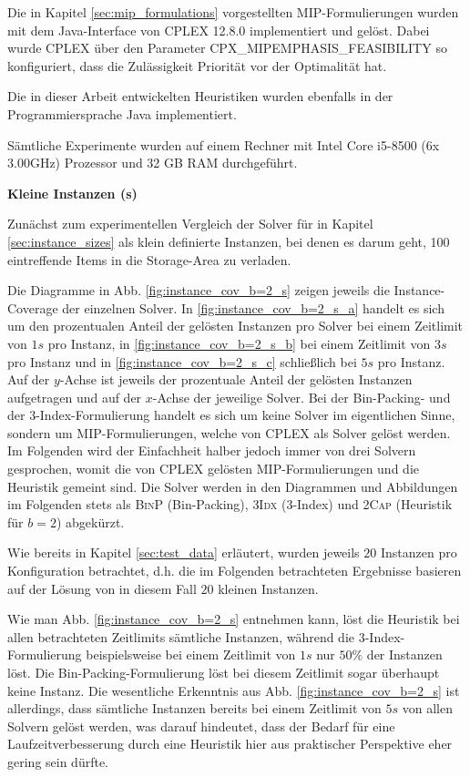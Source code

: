 Die in Kapitel \ref{sec:mip_formulations} vorgestellten MIP-Formulierungen wurden mit dem Java-Interface von CPLEX 12.8.0 implementiert
und gelöst. Dabei wurde CPLEX über den Parameter \textsc{CPX\_MIPEMPHASIS\_FEASIBILITY} so konfiguriert, dass die Zulässigkeit
Priorität vor der Optimalität hat.\cite{IBM_DOC}

Die in dieser Arbeit entwickelten Heuristiken wurden ebenfalls in der Programmiersprache Java implementiert.

Sämtliche Experimente wurden auf einem Rechner mit Intel Core i5-8500 (6x 3.00GHz) Prozessor und 32 GB RAM durchgeführt.

\pagebreak

\textbf{Kleine Instanzen (s)}

Zunächst zum experimentellen Vergleich der Solver für in Kapitel \ref{sec:instance_sizes} als klein definierte Instanzen,
bei denen es darum geht, 100 eintreffende Items in die Storage-Area zu verladen.

Die Diagramme in Abb. \ref{fig:instance_cov_b=2_s} zeigen jeweils die Instance-Coverage der einzelnen Solver.
In \ref{fig:instance_cov_b=2_s_a} handelt es sich um den prozentualen Anteil der gelösten Instanzen pro Solver bei einem Zeitlimit
von $1s$ pro Instanz, in \ref{fig:instance_cov_b=2_s_b} bei einem Zeitlimit von $3s$ pro Instanz und in \ref{fig:instance_cov_b=2_s_c}
schließlich bei $5s$ pro Instanz.\newline
Auf der $y$-Achse ist jeweils der prozentuale Anteil der gelösten Instanzen aufgetragen und auf der $x$-Achse der jeweilige Solver.
Bei der Bin-Packing- und der 3-Index-Formulierung handelt es sich um keine Solver im eigentlichen Sinne,
sondern um MIP-Formulierungen, welche von CPLEX als Solver gelöst werden.
Im Folgenden wird der Einfachheit halber jedoch immer von drei Solvern gesprochen, womit die von
CPLEX gelösten MIP-Formulierungen und die Heuristik gemeint sind.
Die Solver werden in den Diagrammen und Abbildungen im Folgenden stets als \textsc{BinP} (Bin-Packing),
\textsc{3Idx} (3-Index) und \textsc{2Cap} (Heuristik für $b = 2$) abgekürzt.

Wie bereits in Kapitel \ref{sec:test_data} erläutert, wurden jeweils $20$ Instanzen pro Konfiguration betrachtet,
d.h. die im Folgenden betrachteten Ergebnisse basieren auf der Lösung von in diesem Fall $20$ kleinen Instanzen.

Wie man Abb. \ref{fig:instance_cov_b=2_s} entnehmen kann, löst die Heuristik bei allen betrachteten Zeitlimits sämtliche Instanzen,
während die 3-Index-Formulierung beispielsweise bei einem Zeitlimit von $1s$ nur $50 \%$ der Instanzen löst.
Die Bin-Packing-Formulierung löst bei diesem Zeitlimit sogar überhaupt keine Instanz.\newline
Die wesentliche Erkenntnis aus Abb. \ref{fig:instance_cov_b=2_s} ist allerdings, dass sämtliche Instanzen bereits bei einem Zeitlimit von $5s$
von allen Solvern gelöst werden, was darauf hindeutet, dass der Bedarf für eine Laufzeitverbesserung durch eine Heuristik hier
aus praktischer Perspektive eher gering sein dürfte.

